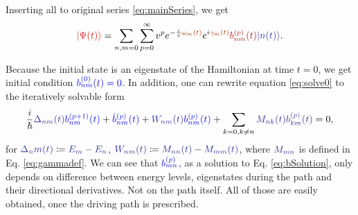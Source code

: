 Inserting all to original series \ref{eq:mainSeries}, we get
\begin{equation}
    \red{\ket{\Psi(t)}}=\sum_{n,m=0}\sum_{p=0}^\infty v^p e^{-\frac{i}{v}\reddd{\omega_m(t)}}e^{i\reddd{\gamma_m(t)}}\redd{b_{nm}^{(p)}(t)}\bluee{\ket{n(t)}}.
    \label{eq:solve0}
\end{equation}

Because the initial state is an eigenstate of the Hamiltonian at time $t=0$, we get initial condition $\blue{b_{nm}^{(0)}(t)=0}$. In addition, one can rewrite equation \ref{eq:solve0} to the iteratively solvable form
\begin{equation}
    \frac{i}{\hbar}\bluee{\Delta_{nm}(t)}\blue{b_{nm}^{(p+1)}(t)}+\blue{\dot b_{nm}^{(p)}(t)}+\bluee{W_{nm}(t)} \blue{b_{nm}^{(p)}(t)}+\sum_{k=0,k\neq n}\bluee{M_{nk}(t)}\bluee{b_{km}^{(p)}(t)}=0,
    \label{eq:bSolution}
\end{equation}
for $\bluee{\Delta_nm(t)}\coloneqq \bluee{E_m-E_n}$, $\bluee{W_{nm}(t)}\coloneqq \bluee{M_{nn}(t)}-\bluee{M_{mm}(t)}$, where $\bluee{M_{mn}}$ is defined in Eq. \ref{eq:gammadef}. We can see that $\blue{b_{mn}^{(p)}}$, as a solution to Eq. \ref{eq:bSolution}, only depends on difference between energy levels, eigenstates during the path and their directional derivatives. Not on the path itself. All of those are easily obtained, once the driving path is prescribed.

















